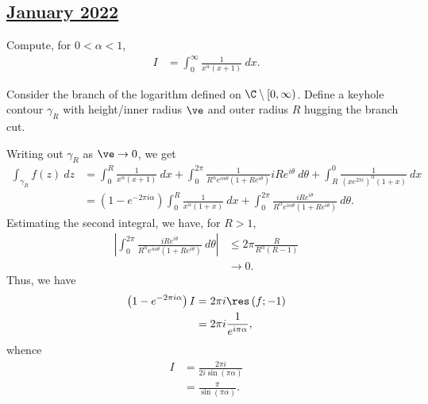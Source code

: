 \documentclass[10pt]{mypackage}
\begin{document}
\subsection{\href{https://math.virginia.edu/graduate/exams/analysis/2022Jan_complex.html}{January 2022}}%
\begin{problem}[Problem 1]
  Compute, for $0 < \alpha <1$,
  \begin{align*}
    I &= \int_{0}^{\infty} \frac{1}{x^{\alpha}\left( x+1 \right)}\:dx.
  \end{align*}
\end{problem}
\begin{solution}
  Consider the branch of the logarithm defined on $\C\setminus \left[ 0,\infty \right)$. Define a keyhole contour $\gamma_R$ with height/inner radius $\ve$ and outer radius $R$ hugging the branch cut.%

  Writing out $\gamma_R$ as $\ve\rightarrow 0$, we get
  \begin{align*}
    \int_{\gamma_R}^{} f(z)\:dz &= \int_{0}^{R} \frac{1}{x^{\alpha}\left( x+1 \right)}\:dx + \int_{0}^{2\pi} \frac{1}{R^{\alpha}e^{i\alpha\theta}\left( 1 + Re^{i\theta} \right)}iRe^{i\theta}\:d\theta + \int_{R}^{0} \frac{1}{\left( xe^{2\pi i} \right)^{\alpha}\left( 1 + x \right)}\:dx\\
                                &= \left( 1-e^{-2\pi i \alpha} \right) \int_{0}^{R} \frac{1}{x^{\alpha}\left( 1 + x \right)}\:dx + \int_{0}^{2\pi} \frac{iRe^{i\theta}}{R^{\alpha}e^{i\alpha\theta}\left( 1 + Re^{i\theta} \right)}\:d\theta.
  \end{align*}
  Estimating the second integral, we have, for $R > 1$,
  \begin{align*}
    \left\vert \int_{0}^{2\pi} \frac{iRe^{i\theta}}{R^{\alpha}e^{i\alpha\theta}\left( 1 + Re^{i\theta} \right)}\:d\theta \right\vert &\leq 2\pi \frac{R}{R^{\alpha}\left( R-1 \right)}\\
                                                                                                                                                    &\rightarrow 0.
  \end{align*}
  Thus, we have
  \begin{align*}
    \left( 1-e^{-2\pi i \alpha} \right)I &= 2\pi i \res\left( f;-1 \right)\\
                                         &= 2\pi i \frac{1}{e^{i\pi \alpha}},
  \end{align*}
  whence
  \begin{align*}
    I &= \frac{2\pi i}{2i\sin\left( \pi\alpha \right)}\\
      &= \frac{\pi}{\sin\left( \pi\alpha \right)}.
  \end{align*}
\end{solution}
\end{document}
